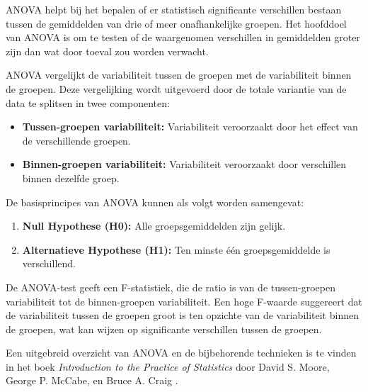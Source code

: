 ANOVA helpt bij het bepalen of er statistisch significante verschillen bestaan tussen de gemiddelden van drie of meer onafhankelijke groepen. Het hoofddoel van ANOVA is om te testen of de waargenomen verschillen in gemiddelden groter zijn dan wat door toeval zou worden verwacht.

ANOVA vergelijkt de variabiliteit tussen de groepen met de variabiliteit binnen de groepen. Deze vergelijking wordt uitgevoerd door de totale variantie van de data te splitsen in twee componenten:
\begin{itemize}
    \item \textbf{Tussen-groepen variabiliteit:} Variabiliteit veroorzaakt door het effect van de verschillende groepen.
    \item \textbf{Binnen-groepen variabiliteit:} Variabiliteit veroorzaakt door verschillen binnen dezelfde groep.
\end{itemize}

De basisprincipes van ANOVA kunnen als volgt worden samengevat:
\begin{enumerate}
    \item \textbf{Null Hypothese (H0):} Alle groepsgemiddelden zijn gelijk.
    \item \textbf{Alternatieve Hypothese (H1):} Ten minste één groepsgemiddelde is verschillend.
\end{enumerate}

De ANOVA-test geeft een F-statistiek, die de ratio is van de tussen-groepen variabiliteit tot de binnen-groepen variabiliteit. Een hoge F-waarde suggereert dat de variabiliteit tussen de groepen groot is ten opzichte van de variabiliteit binnen de groepen, wat kan wijzen op significante verschillen tussen de groepen.

Een uitgebreid overzicht van ANOVA en de bijbehorende technieken is te vinden in het boek \textit{Introduction to the Practice of Statistics} door David S. Moore, George P. McCabe, en Bruce A. Craig \autocite{moore2012introduction}.






